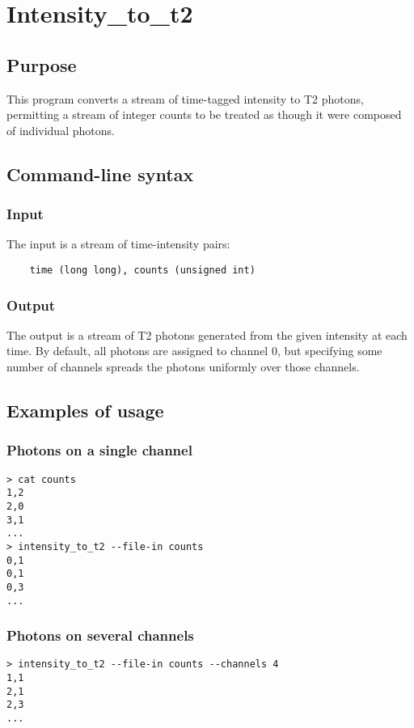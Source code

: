 \section{Intensity\_to\_t2}
\subsection{Purpose}
This program converts a stream of time-tagged intensity to T2 photons, permitting a stream of integer counts to be treated as though it were composed of individual photons.

\subsection{Command-line syntax}


\subsubsection{Input}
The input is a stream of time-intensity pairs:
\begin{verbatim}
    time (long long), counts (unsigned int)
\end{verbatim}

\subsubsection{Output}
The output is a stream of T2 photons generated from the given intensity at each time. By default, all photons are assigned to channel 0, but specifying some number of channels spreads the photons uniformly over those channels.

\subsection{Examples of usage}
\subsubsection{Photons on a single channel}
\begin{verbatim}
> cat counts
1,2
2,0
3,1
...
> intensity_to_t2 --file-in counts
0,1
0,1
0,3
...
\end{verbatim}

\subsubsection{Photons on several channels}
\begin{verbatim}
> intensity_to_t2 --file-in counts --channels 4
1,1
2,1
2,3
...
\end{verbatim}